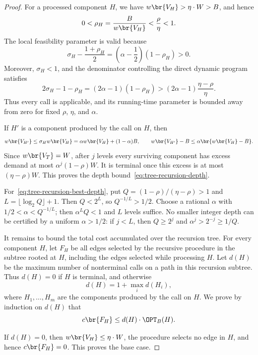 \begin{proof}
    For a processed component $H$, we have $w\br{V_H}>\eta\cdot W>B$, and hence
    \[
        0<\rho_H=\frac{B}{w\br{V_H}}<\frac{\rho}{\eta}<1.
    \]
    The local feasibility parameter is valid because
    \[
        \sigma_H-\frac{1+\rho_H}{2}
        =\left(\alpha-\frac12\right)(1-\rho_H)>0.
    \]
    Moreover, $\sigma_H<1$, and the denominator controlling the direct dynamic program satisfies
    \[
        2\sigma_H-1-\rho_H
        =(2\alpha-1)(1-\rho_H)
        >(2\alpha-1)\frac{\eta-\rho}{\eta}.
    \]
    Thus every call is applicable, and its running-time parameter is bounded away from zero for fixed $\rho$, $\eta$, and $\alpha$.

    If $H'$ is a component produced by the call on $H$, then
    \[
        w\br{V_{H'}}
        \leq\sigma_H w\br{V_H}
        =\alpha w\br{V_H}+(1-\alpha)B,
        \qquad
        w\br{V_{H'}}-B\leq\alpha\br{w\br{V_H}-B}.
    \]
    Since $w\br{V_T}=W$, after $j$ levels every surviving component has excess demand at most $\alpha^j(1-\rho)W$. It is terminal once this excess is at most $(\eta-\rho)W$. This proves the depth bound~\eqref{eq:tree-recursion-depth}.

    For~\eqref{eq:tree-recursion-best-depth}, put $Q=(1-\rho)/(\eta-\rho)>1$ and $L=\lfloor\log_2 Q\rfloor+1$. Then $Q<2^L$, so $Q^{-1/L}>1/2$. Choose a rational $\alpha$ with $1/2<\alpha<Q^{-1/L}$; then $\alpha^LQ<1$ and $L$ levels suffice. No smaller integer depth can be certified by a uniform $\alpha>1/2$: if $j<L$, then $Q\geq2^j$ and $\alpha^j>2^{-j}\geq1/Q$.

    It remains to bound the total cost accumulated over the recursion tree. For every component $H$, let $F_H$ be all edges selected by the recursive procedure in the subtree rooted at $H$, including the edges selected while processing $H$. Let $d(H)$ be the maximum number of nonterminal calls on a path in this recursion subtree. Thus $d(H)=0$ if $H$ is terminal, and otherwise
    \[
        d(H)=1+\max_i d(H_i),
    \]
    where $H_1,\ldots,H_m$ are the components produced by the call on $H$. We prove by induction on $d(H)$ that
    \begin{equation}\label{eq:tree-recursion-inductive-cost}
        c\br{F_H}\leq d(H)\cdot\OPT_B(H).
    \end{equation}

    If $d(H)=0$, then $w\br{V_H}\leq\eta\cdot W$, the procedure selects no edge in $H$, and hence $c\br{F_H}=0$. This proves the base case.


\end{proof}
